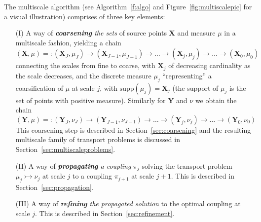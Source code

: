 \documentclass[twoside,11pt]{article}
\newcommand{\coupling}[0]{\pi}
\newcommand{\Xsp}{{\mathbf{X}}}
\newcommand{\Ysp}{{\mathbf{Y}}}
\begin{document}
The multiscale algorithm (see Algorithm~\ref{f:algo} and
Figure~\ref{fig:multiscalepic} for a visual illustration) comprises of three
key elements: 
\begin{itemize}
\item[(I)] A way of {\textit{\textbf{coarsening} the sets}} of source points ${\Xsp}$ and  measure $\mu$ in a multiscale fashion, yielding a chain
\begin{equation}
({\Xsp},\mu)=:({\Xsp}_J,\mu_J) \rightarrow({\Xsp}_{J-1},\mu_{J-1})
\rightarrow\dots\rightarrow({\Xsp}_j,\mu_j)
\rightarrow\dots\rightarrow({\Xsp}_0,\mu_0) 
\end{equation}
connecting the scales from fine to coarse, with ${\Xsp}_j$ of decreasing
cardinality as the scale decreases, and the discrete measure $\mu_j$
``representing'' a coarsification of $\mu$ at scale $j$, with
$\mathrm{supp}(\mu_j)={\Xsp}_j$ (the support of $\mu_j$ is the set of points
with positive measure). Similarly for $\Ysp$ and $\nu$ we obtain the chain
\begin{equation}
({\Ysp},\mu)=:({\Ysp}_J,\nu_J) \rightarrow({\Ysp}_{J-1},\nu_{J-1})
\rightarrow\dots\rightarrow({\Ysp}_j,\nu_j)
\rightarrow\dots\rightarrow({\Ysp}_0,\nu_0) 
\end{equation}
This coarsening step is described in Section~\ref{sec:coarsening} and the
resulting multiscale family of transport problems is discussed in
Section~\ref{sec:multiscaleproblems}.
\item[(II)] A way of {\textit{\textbf{propagating} a coupling}} $\coupling_j$
  solving the transport problem $\mu_j\rightarrowtail\nu_j$ at scale $j$ to a
  coupling $\coupling_{j+1}$ at
  scale $j+1$. This is described in Section~\ref{sec:propagation}.
\item[(III)] A way of {\textit{\textbf{refining} the propagated solution}} to
the optimal coupling at scale $j$. This is described in
Section~\ref{sec:refinement}.  
\end{itemize}

\end{document}
